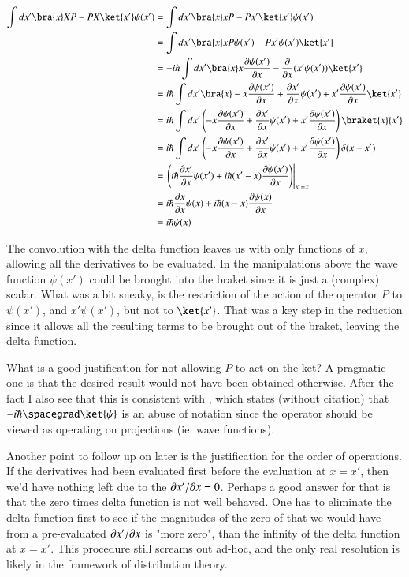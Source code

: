 \begin{align*}
\int dx' \bra{x} XP - PX \ket{x'} \psi(x')
&=
\int dx' \bra{x} x P - P x' \ket{x'} \psi(x') \\
&=
\int dx' \bra{x} x P \psi(x') - P x' \psi(x') \ket{x'} \\
&=
-i\hbar
\int dx' \bra{x} x \PD{x}{\psi(x')} - \PD{x}{}( x' \psi(x')) \ket{x'} \\
&=
i\hbar
\int dx' \bra{x} -x \PD{x}{\psi(x')} + \PD{x}{x'} \psi(x') + x' \PD{x}{\psi(x')} \ket{x'} \\
&=
i\hbar
\int dx' \left(-x \PD{x}{\psi(x')} + \PD{x}{x'} \psi(x') + x' \PD{x}{\psi(x')}\right) \braket{x}{x'} \\
&=
i\hbar
\int dx' \left(-x \PD{x}{\psi(x')} + \PD{x}{x'} \psi(x') + x' \PD{x}{\psi(x')}\right) \delta(x-x') \\
&=
\left.
\left( i \hbar \PD{x}{x'} \psi(x') + i \hbar (x' - x )\PD{x}{\psi(x')} \right)
\right\vert_{x'=x} \\
&=
i\hbar \PD{x}{x} \psi(x) + i \hbar (x - x )\PD{x}{\psi(x)}  \\
&=
i\hbar \psi(x)
\end{align*}

The convolution with the delta function leaves us with only functions of $x$, allowing all the derivatives to be evaluated.  In the manipulations above the wave function $\psi(x')$ could be brought into the braket since it is just a (complex) scalar.  What was a bit sneaky, is the restriction of the action of the operator $P$ to $\psi(x')$, and $x'\psi(x')$, but not to $\ket{x'}$.  That was a key step in the reduction since it allows all the resulting terms to be brought out of the braket, leaving the delta function.

What is a good justification for not allowing $P$ to act on the ket?  A pragmatic one is that the desired result would not have been obtained otherwise.  After the fact I also see that this is consistent with \cite{wiki:braketNotation}, which states (without citation) that $-i\hbar \spacegrad \ket{\psi}$ is an abuse of notation since the operator should be viewed as operating on projections (ie: wave functions).

Another point to follow up on later is the justification for the order of operations.  If the derivatives had been evaluated first before the evaluation at $x=x'$, then we'd have nothing left due to the $\PDi{x}{x'} = 0$.  Perhaps a good answer for that is that the zero times delta function is not well behaved.  One has to eliminate the delta function first to see if the magnitudes of the zero of that we would have from a pre-evaluated $\PDi{x}{x'}$ is "more zero", than the infinity of the delta function at $x = x'$.  This procedure still screams out ad-hoc, and the only real resolution is likely in the framework of distribution theory.


